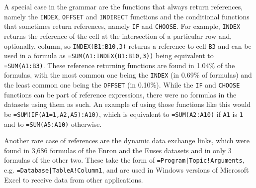 \documentclass[times]{smrauth}
\begin{document}
A special case in the grammar are the functions that always return references, namely the \texttt{INDEX}, \texttt{OFFSET} and \texttt{INDIRECT} functions and the conditional functions that sometimes return references, namely \texttt{IF} and \texttt{CHOOSE}.
For example, \texttt{INDEX} returns the reference of the cell at the intersection of a particular row and, optionally, column, so \texttt{INDEX(B1:B10,3)} returns a reference to cell \texttt{B3} and can be used in a formula as \texttt{=SUM(A1:INDEX(B1:B10,3))} being equivalent to \texttt{=SUM(A1:B3)}.
These reference returning functions are found in 1.04\% of the formulas, with the most common one being the \texttt{INDEX} (in 0.69\% of formulas) and the least common one being the \texttt{OFFSET} (in 0.10\%).
While the \texttt{IF} and \texttt{CHOOSE} functions can be part of reference expressions, there were no formulas in the datasets using them as such.
An example of using those functions like this would be \texttt{=SUM(IF(A1=1,A2,A5):A10)}, which is equivalent to \texttt{=SUM(A2:A10)} if \texttt{A1} is \texttt{1} and to \texttt{=SUM(A5:A10)} otherwise.

Another rare case of references are the dynamic data exchange links, which were found in 3,686 formulas of the Enron and the Euses datasets and in only 3 formulas of the other two. These take the form of \texttt{=Program|Topic!Arguments}, e.g. \texttt{=Database|TableA!Column1}, and are used in Windows versions of Microsoft Excel to receive  data from other applications.
\end{document}
